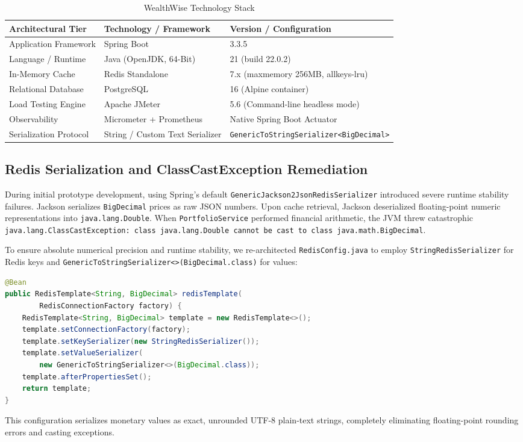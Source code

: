 \documentclass[11pt,a4paper]{article}
\begin{document}
\begin{table}[htbp]
\centering
\caption{WealthWise Technology Stack}
\label{tab:tech_stack}
\small
\begin{tabular}{lll}
\toprule
\textbf{Architectural Tier} & \textbf{Technology / Framework} & \textbf{Version / Configuration} \\
\midrule
Application Framework & Spring Boot & 3.3.5 \\
Language / Runtime    & Java (OpenJDK, 64-Bit) & 21 (build 22.0.2) \\
In-Memory Cache       & Redis Standalone & 7.x (maxmemory 256MB, allkeys-lru) \\
Relational Database   & PostgreSQL & 16 (Alpine container) \\
Load Testing Engine   & Apache JMeter & 5.6 (Command-line headless mode) \\
Observability         & Micrometer + Prometheus & Native Spring Boot Actuator \\
Serialization Protocol& String / Custom Text Serializer & \texttt{GenericToStringSerializer<BigDecimal>} \\
\bottomrule
\end{tabular}
\end{table}

\subsection{Redis Serialization and ClassCastException Remediation}

During initial prototype development, using Spring's default \texttt{GenericJackson2JsonRedisSerializer} introduced severe runtime stability failures. Jackson serializes \texttt{BigDecimal} prices as raw JSON numbers. Upon cache retrieval, Jackson deserialized floating-point numeric representations into \texttt{java.lang.Double}. When \texttt{PortfolioService} performed financial arithmetic, the JVM threw catastrophic \texttt{java.lang.ClassCastException: class java.lang.Double cannot be cast to class java.math.BigDecimal}.

To ensure absolute numerical precision and runtime stability, we re-architected \texttt{RedisConfig.java} to employ \texttt{StringRedisSerializer} for Redis keys and \texttt{GenericToStringSerializer<>(BigDecimal.class)} for values:
\begin{lstlisting}[language=Java,basicstyle=\footnotesize\ttfamily,breaklines=true,frame=single]
@Bean
public RedisTemplate<String, BigDecimal> redisTemplate(
        RedisConnectionFactory factory) {
    RedisTemplate<String, BigDecimal> template = new RedisTemplate<>();
    template.setConnectionFactory(factory);
    template.setKeySerializer(new StringRedisSerializer());
    template.setValueSerializer(
        new GenericToStringSerializer<>(BigDecimal.class));
    template.afterPropertiesSet();
    return template;
}
\end{lstlisting}
This configuration serializes monetary values as exact, unrounded UTF-8 plain-text strings, completely eliminating floating-point rounding errors and casting exceptions.
\end{document}
